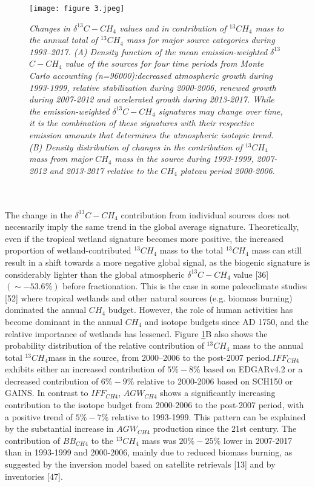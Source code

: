 \documentclass[a4paper,12pt]{article}
\begin{document}
\begin{figure}[h]
    \caption{}
    \texttt{[image: figure 3.jpeg]}
    \label{fig3:my_label}


\textit{\scriptsize{Changes in $\delta^{13}$$C-CH_{4}$ values and in contribution of $^{13}CH_{4}$ mass to the annual total of $^{13}CH_{4}$ mass for major source categories during 1993–2017. (A) Density function of the mean emission-weighted $\delta^{13}$$C-CH_{4}$ value of the sources for four time periods from Monte Carlo accounting (n=96000):decreased atmospheric growth during 1993-1999, relative stabilization during 2000-2006, renewed growth during 2007-2012 and accelerated growth during 2013-2017. While the emission-weighted $\delta^{13}$$C-CH_{4}$ signatures may change over time, it is the combination of these signatures with their respective emission amounts that determines the atmospheric isotopic trend. (B) Density distribution of changes in the contribution of $^{13}CH_{4}$ mass from major $CH_{4}$ mass in the source during 1993-1999, 2007-2012 and 2013-2017 relative to the $CH_{4}$ plateau period 2000-2006.}}
\end{figure}
\\\\
\small{The change in the $\delta^{13}$$C-CH_{4}$ contribution from individual sources does not necessarily imply the same trend in the global average signature. Theoretically, even if the tropical wetland signature becomes more positive, the increased proportion of wetland-contributed $^{13}CH_{4}$ mass to the total $^{13}CH_{4}$ mass can still result in a shift towards a more negative global signal, as the biogenic signature is considerably lighter than the global atmospheric $\delta^{13}$$C-CH_{4}$ value [36] $(\sim-53.6\%)$ before fractionation. This is the case in some paleoclimate studies [52] where tropical wetlands and other natural sources (e.g. biomass burning) dominated the annual $CH_{4}$ budget. However, the role of human activities has become dominant in the annual $CH_{4}$ and isotope budgets since AD 1750, and the relative importance of wetlands has lessened. Figure \ref{fig3:my_label}B also shows the probability distribution of the relative contribution of $^{13}CH_{4}$ mass to the annual total $^{13}CH_{4}$mass in the source, from 2000–2006 to the post-2007 period.$IFF_{CH4}$ exhibits either an increased contribution of $5\%-8\%$ based on EDGARv4.2 or a decreased contribution of $6\%-9\%$ relative to 2000-2006 based on SCH150 or GAINS. In contrast to $IFF_{CH4}$, $AGW_{CH4}$ shows a significantly increasing contribution to the isotope budget from 2000-2006 to the post-2007 period, with a positive trend of $5\%-7\%$ relative to 1993-1999. This pattern can be explained by the substantial increase in $AGW_{CH4}$ production since the 21st century. The contribution of $BB_{CH4}$ to the $^{13}CH_{4}$ mass was $20\%-25\%$ lower in 2007-2017 than in 1993-1999 and 2000-2006, mainly due to reduced biomass burning, as suggested by the inversion model based on satellite retrievals [13] and by inventories [47].}
\end{document}
